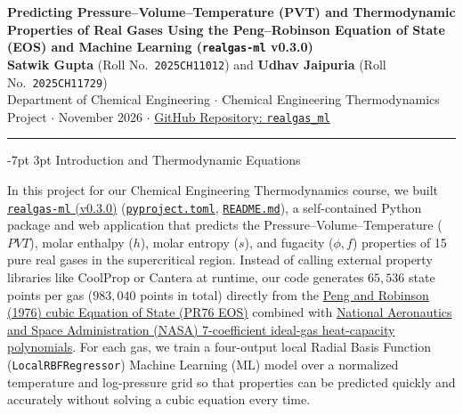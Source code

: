 \documentclass[10pt,a4paper]{article}
\makeatletter
\renewcommand\section{\@startsection {section}{1}{\z@}%
  {-7pt \@plus -2pt \@minus -1pt}%
  {3pt \@plus 1pt}%
  {\normalfont\large\bfseries\color{darkslate}}}
\makeatother
\begin{document}
\begin{center}
  {\LARGE\bfseries\color{darkslate} Predicting Pressure--Volume--Temperature (PVT) and Thermodynamic Properties of Real Gases Using the Peng--Robinson Equation of State (EOS) and Machine Learning (\texttt{realgas-ml} v0.3.0)}\\[5pt]
  {\normalsize \textbf{Satwik Gupta} (Roll No.\ \texttt{2025CH11012}) \quad and \quad \textbf{Udhav Jaipuria} (Roll No.\ \texttt{2025CH11729})}\\[2pt]
  {\footnotesize Department of Chemical Engineering $\cdot$ Chemical Engineering Thermodynamics Project $\cdot$ November 2026 $\cdot$ \href{https://github.com/satwikgupta122/realgas_ml}{GitHub Repository: \texttt{realgas\_ml}}}
\end{center}
\vspace{-4pt}
\noindent\textcolor{headerteal}{\rule{\textwidth}{0.8pt}}
\vspace{-8pt}

\section{Introduction and Thermodynamic Equations}

In this project for our Chemical Engineering Thermodynamics course, we built \href{https://github.com/satwikgupta122/realgas_ml}{\texttt{realgas-ml} (v0.3.0)} (\href{https://github.com/satwikgupta122/realgas_ml/blob/main/pyproject.toml}{\texttt{pyproject.toml}}, \href{https://github.com/satwikgupta122/realgas_ml/blob/main/README.md}{\texttt{README.md}}), a self-contained Python package and web application that predicts the Pressure--Volume--Temperature ($PVT$), molar enthalpy ($h$), molar entropy ($s$), and fugacity ($\phi, f$) properties of 15 pure real gases in the supercritical region. Instead of calling external property libraries like CoolProp or Cantera at runtime, our code generates $65{,}536$ state points per gas ($983{,}040$ points in total) directly from the \href{https://doi.org/10.1021/i160057a011}{Peng and Robinson (1976) cubic Equation of State (PR76 EOS)} combined with \href{https://ntrs.nasa.gov/citations/19940013151}{National Aeronautics and Space Administration (NASA) 7-coefficient ideal-gas heat-capacity polynomials}. For each gas, we train a four-output local Radial Basis Function (\texttt{LocalRBFRegressor}) Machine Learning (ML) model over a normalized temperature and log-pressure grid so that properties can be predicted quickly and accurately without solving a cubic equation every time.
\end{document}
